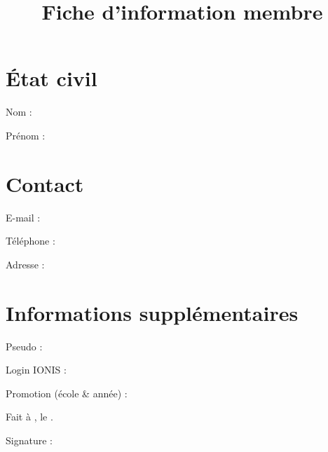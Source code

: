 \documentclass[a4paper,12pt]{prologin}
\title{Fiche d'information membre}
\begin{document}
\section*{État civil}

Nom : \dotfill

Prénom : \dotfill

\section*{Contact}

E-mail : \dotfill

Téléphone : \dotfill

Adresse : \dotfill

\dotfill

\section*{Informations supplémentaires}
Pseudo : \dotfill

Login IONIS : \dotfill

Promotion (école \& année) : \dotfill

\vspace{2cm}

Fait à \dotspace{4cm}, le \dotspace{4cm}.

Signature :
\end{document}
